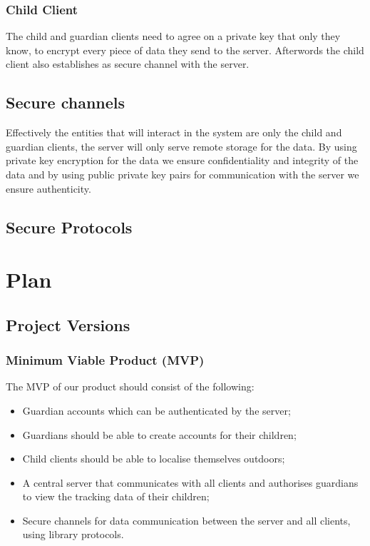 \documentclass[a4paper]{article}
\begin{document}
\subsubsection{Child Client}
The child and guardian clients need to agree on a private key that only they know, to encrypt every
piece of data they send to the server. Afterwords the child client also establishes as secure
channel with the server.

\subsection{Secure channels}
Effectively the entities that will interact in the system are only the child and guardian clients,
the server will only serve remote storage for the data. By using private key encryption for the data
we ensure confidentiality and integrity of the data and by using public private key pairs for
communication with the server we ensure authenticity.

\subsection{Secure Protocols}


\section{Plan}

\subsection{Project Versions}


\subsubsection{Minimum Viable Product (MVP)}
The MVP of our product should consist of the following:
\begin{itemize}
    \item Guardian accounts which can be authenticated by the server;
    \item Guardians should be able to create accounts for their children;
    \item Child clients should be able to localise themselves outdoors;
    \item A central server that communicates with all clients and authorises guardians to view the
        tracking data of their children;
    \item Secure channels for data communication between the server and all clients, using library
        protocols.
\end{itemize}
\end{document}

